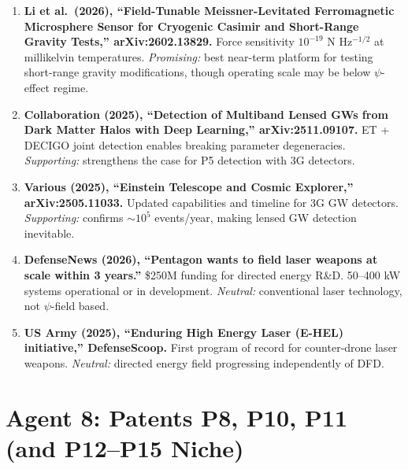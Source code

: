 \documentclass[11pt]{article}
\begin{document}
\begin{tcolorbox}[colback=green!5!white, colframe=green!50!black,
  title=\textbf{Agent 7: NEW LITERATURE REVIEWED}]

\begin{enumerate}

\item \textbf{Li et al.\ (2026), ``Field-Tunable Meissner-Levitated
  Ferromagnetic Microsphere Sensor for Cryogenic Casimir and Short-Range
  Gravity Tests,'' arXiv:2602.13829.}
  Force sensitivity $10^{-19}$ N Hz$^{-1/2}$ at millikelvin temperatures.
  \emph{Promising:} best near-term platform for testing short-range
  gravity modifications, though operating scale may be below $\psi$-effect
  regime.

\item \textbf{Collaboration (2025), ``Detection of Multiband Lensed GWs
  from Dark Matter Halos with Deep Learning,'' arXiv:2511.09107.}
  ET + DECIGO joint detection enables breaking parameter degeneracies.
  \emph{Supporting:} strengthens the case for P5 detection with 3G
  detectors.

\item \textbf{Various (2025), ``Einstein Telescope and Cosmic Explorer,''
  arXiv:2505.11033.}
  Updated capabilities and timeline for 3G GW detectors.
  \emph{Supporting:} confirms $\sim 10^5$ events/year, making lensed
  GW detection inevitable.

\item \textbf{DefenseNews (2026), ``Pentagon wants to field laser weapons
  at scale within 3 years.''}
  \$250M funding for directed energy R\&D. 50--400 kW systems operational
  or in development. \emph{Neutral:} conventional laser technology,
  not $\psi$-field based.

\item \textbf{US Army (2025), ``Enduring High Energy Laser (E-HEL)
  initiative,'' DefenseScoop.}
  First program of record for counter-drone laser weapons.
  \emph{Neutral:} directed energy field progressing independently of DFD.

\end{enumerate}
\end{tcolorbox}

\section{Agent 8: Patents P8, P10, P11 (and P12--P15 Niche)}
\end{document}
